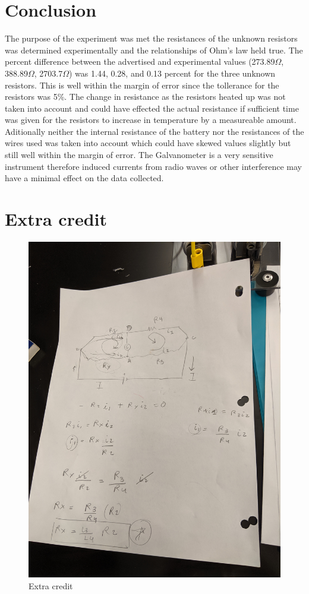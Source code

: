 \documentclass[12pt, letterpaper]{article}
\begin{document}
\section*{Conclusion}
The purpose of the experiment was met the resistances of the unknown resistors was determined experimentally and the relationships of Ohm's law held true. The percent difference between the advertised and experimental values (273.89\(\Omega\), 388.89\(\Omega\), 2703.7\(\Omega\)) was 1.44, 0.28, and 0.13 percent for the three unknown resistors. This is well within the margin of error since the tollerance for the resistors was 5\%. The change in resistance as the resistors heated up was not taken into account and could have effected the actual resistance if sufficient time was given for the resistors to increase in temperature by a measureable amount. Aditionally neither the internal resistance of the battery nor the resistances of the wires used was taken into account which could have skewed values slightly but still well within the margin of error. The Galvanometer is a very sensitive instrument therefore induced currents from radio waves or other interference may have a minimal effect on the data collected.

\section*{Extra credit}

\begin{figure}[H]
    \centering
    \includegraphics[width=\textwidth]{Extracredit}
    \caption{Extra credit}
    \label{fig:Extra credit}
\end{figure}
\end{document}
